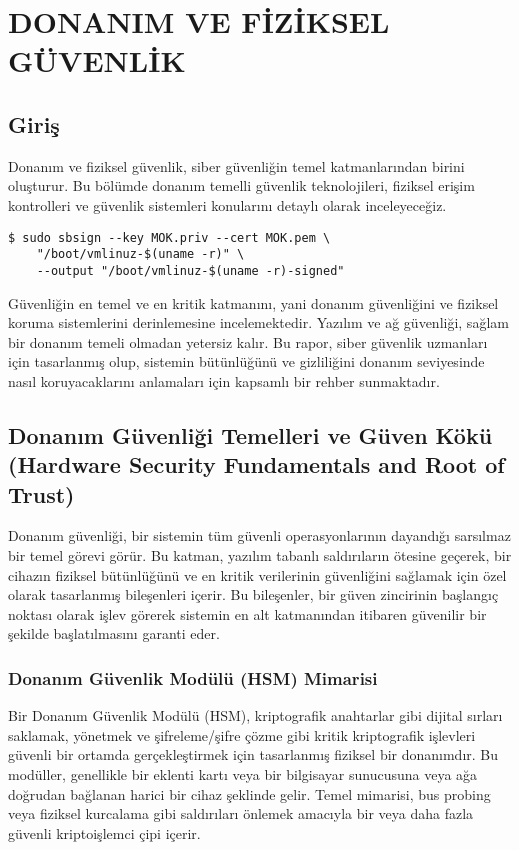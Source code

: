 ﻿\chapter{DONANIM VE FİZİKSEL GÜVENLİK}

\section*{Giriş}
Donanım ve fiziksel güvenlik, siber güvenliğin temel katmanlarından birini oluşturur. Bu bölümde donanım temelli güvenlik teknolojileri, fiziksel erişim kontrolleri ve güvenlik sistemleri konularını detaylı olarak inceleyeceğiz.
    \begin{lstlisting}[breaklines=true,basicstyle=\ttfamily\footnotesize]
$ sudo sbsign --key MOK.priv --cert MOK.pem \
    "/boot/vmlinuz-$(uname -r)" \
    --output "/boot/vmlinuz-$(uname -r)-signed"
    \end{lstlisting}

Güvenliğin en temel ve en kritik katmanını, yani donanım güvenliğini ve fiziksel koruma sistemlerini derinlemesine incelemektedir. Yazılım ve ağ güvenliği, sağlam bir donanım temeli olmadan yetersiz kalır. Bu rapor, siber güvenlik uzmanları için tasarlanmış olup, sistemin bütünlüğünü ve gizliliğini donanım seviyesinde nasıl koruyacaklarını anlamaları için kapsamlı bir rehber sunmaktadır.

\section{Donanım Güvenliği Temelleri ve Güven Kökü (Hardware Security Fundamentals and Root of Trust)}

Donanım güvenliği, bir sistemin tüm güvenli operasyonlarının dayandığı sarsılmaz bir temel görevi görür. Bu katman, yazılım tabanlı saldırıların ötesine geçerek, bir cihazın fiziksel bütünlüğünü ve en kritik verilerinin güvenliğini sağlamak için özel olarak tasarlanmış bileşenleri içerir. Bu bileşenler, bir güven zincirinin başlangıç noktası olarak işlev görerek sistemin en alt katmanından itibaren güvenilir bir şekilde başlatılmasını garanti eder.

\subsection{Donanım Güvenlik Modülü (HSM) Mimarisi}

Bir Donanım Güvenlik Modülü (HSM), kriptografik anahtarlar gibi dijital sırları saklamak, yönetmek ve şifreleme/şifre çözme gibi kritik kriptografik işlevleri güvenli bir ortamda gerçekleştirmek için tasarlanmış fiziksel bir donanımdır. Bu modüller, genellikle bir eklenti kartı veya bir bilgisayar sunucusuna veya ağa doğrudan bağlanan harici bir cihaz şeklinde gelir. Temel mimarisi, bus probing veya fiziksel kurcalama gibi saldırıları önlemek amacıyla bir veya daha fazla güvenli kriptoişlemci çipi içerir.

